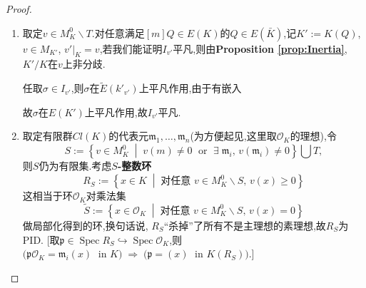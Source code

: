 \documentclass[12pt,A4paper,oneside,reqno]{amsart}
\numberwithin{equation}{section}
\theoremstyle{definition}
\theoremstyle{plain}
\theoremstyle{plain}
\numberwithin{equation}{section}
\theoremstyle{remark}
\newcommand{\Spec}{\operatorname{Spec}}
\begin{document}
\begin{proof}
	\begin{enumerate}[1.]
		\item 取定$v \in M_K^{0} \smallsetminus T$.对任意满足$[m]Q \in E(K)$的$Q \in E(\bar{K})$,记$K':=K(Q)$, $v \in M_{K'}$, $v'|_K=v$,若我们能证明$I_{v'}$平凡,则由\textbf{Proposition \ref{prop:Inertia}}, $K'/K$在$v$上非分歧.
		
		任取$\sigma \in I_{v'}$,则$\sigma$在$\tilde{E}(k'_{v'})$上平凡作用,由于有嵌入
		\begin{center}
		\end{center}
	故$\sigma$在$E(K')$上平凡作用,故$I_{v'}$平凡.
		\item 取定有限群$Cl(K)$的代表元$\mathfrak{m}_1,\ldots , \mathfrak{m}_n$(为方便起见,这里取$\mathcal{O}_K$的理想),令
		$$S:=\left\{v \in M_K^0 \;\middle|\; v(m) \neq 0  \;\text{ or }\; \exists\; \mathfrak{m}_i,\, v(\mathfrak{m}_i) \neq 0\right\} 
		\bigcup T, $$
		则$S$仍为有限集.考虑\textbf{$S$-整数环}
		$$R_S:=\left\{x \in K \;\middle|\;\text{对任意 }v \in M_K^{0} \smallsetminus S ,\, v(x) \geqslant 0  \right\}$$
		这相当于环$\mathcal{O}_K$对乘法集
		$$\tilde{S}:=\left\{x \in \mathcal{O}_K \;\middle|\;\text{对任意 }v \in M_K^{0} \smallsetminus S ,\, v(x) = 0  \right\}$$
		做局部化得到的环,换句话说, $R_S$“杀掉”了所有不是主理想的素理想,故$R_S$为PID. [取$\mathfrak{p} \in \Spec R_S \hookrightarrow \Spec \mathcal{O}_K$,则
		$\big(\mathfrak{p}\mathcal{O}_K=\mathfrak{m}_i (x) \; \text{ in }K\big) \;\Longrightarrow\; \big(\mathfrak{p}=(x) \; \text{ in }K(R_S)\big)$.]
		

\end{enumerate}
\end{proof}
\end{document}
